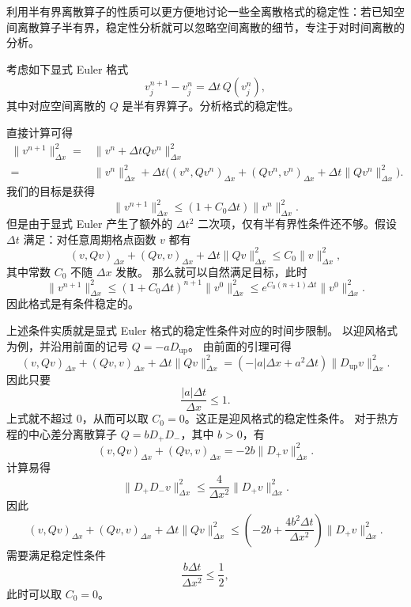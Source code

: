 利用半有界离散算子的性质可以更方便地讨论一些全离散格式的稳定性：若已知空间离散算子半有界，稳定性分析就可以忽略空间离散的细节，专注于对时间离散的分析。

\begin{example}
    考虑如下显式 Euler 格式
    \[
        v_j^{n+1} - v_j^n = \Delta t \,Q(v_j^n),
    \]
    其中对应空间离散的 $Q$ 是半有界算子。分析格式的稳定性。
\end{example}

\begin{solution*}
    直接计算可得
    \begin{align*}
        \|v^{n+1}\|_{\Delta x}^2
        ={} & \|v^n + \Delta t Qv^n\|_{\Delta x}^2 \\
        ={} & \|v^n\|_{\Delta x}^2
        + \Delta t \bigg((v^n,Qv^n)_{\Delta x}+(Qv^n,v^n)_{\Delta x}
        + \Delta t \|Qv^n\|_{\Delta x}^2\bigg).
    \end{align*}
    我们的目标是获得
    \[
        \|v^{n+1}\|_{\Delta x}^2
        \le{}
        \left(1+C_0\Delta t\right)\|v^n\|_{\Delta x}^2.
    \]
    但是由于显式 Euler 产生了额外的 $\Delta t^2$ 二次项，仅有半有界性条件还不够。假设 $\Delta t$ 满足：对任意周期格点函数 $v$ 都有
    \[
        (v,Qv)_{\Delta x} + (Qv,v)_{\Delta x} + \Delta t \|Qv\|_{\Delta x}^2
        \le C_0 \|v\|_{\Delta x}^2,
    \]
    其中常数 $C_0$ 不随 $\Delta x$ 发散。
    那么就可以自然满足目标，此时
    \[
        \|v^{n+1}\|_{\Delta x}^2
        \le \left(1+C_0\Delta t\right)^{n+1}\|v^0\|_{\Delta x}^2
        \le e^{C_0(n+1)\Delta t}\|v^0\|_{\Delta x}^2.
    \]
    因此格式是有条件稳定的。
\end{solution*}

\begin{remark}
    上述条件实质就是显式 Euler 格式的稳定性条件对应的时间步限制。
    以迎风格式为例，并沿用前面的记号
    $Q=-aD_{\mathrm{up}}$。
    由前面的引理可得
    \[
        (v,Qv)_{\Delta x}+(Qv,v)_{\Delta x}
        +\Delta t\|Qv\|_{\Delta x}^2
        =
        \left(-|a|\Delta x+a^2\Delta t\right)\|D_{\mathrm{up}}v\|_{\Delta x}^2.
    \]
    因此只要
    \[
        \frac{|a|\Delta t}{\Delta x}\le 1.
    \]
    上式就不超过 $0$，从而可以取 $C_0=0$。这正是迎风格式的稳定性条件。
    对于热方程的中心差分离散算子 $Q=bD_+D_-$，其中 $b>0$，有
    \[
        (v,Qv)_{\Delta x}+(Qv,v)_{\Delta x}
        =
        -2b\|D_+v\|_{\Delta x}^2.
    \]
    计算易得
    \[
        \|D_+D_-v\|_{\Delta x}^2
        \le \frac{4}{\Delta x^2}\|D_+v\|_{\Delta x}^2.
    \]
    因此
    \[
        (v,Qv)_{\Delta x}+(Qv,v)_{\Delta x}
        +\Delta t\|Qv\|_{\Delta x}^2
        \le
        \left(-2b+\frac{4b^2\Delta t}{\Delta x^2}\right)
        \|D_+v\|_{\Delta x}^2.
    \]
    需要满足稳定性条件
    \[
        \frac{b\Delta t}{\Delta x^2}\le \frac12,
    \]
    此时可以取 $C_0=0$。
\end{remark}

